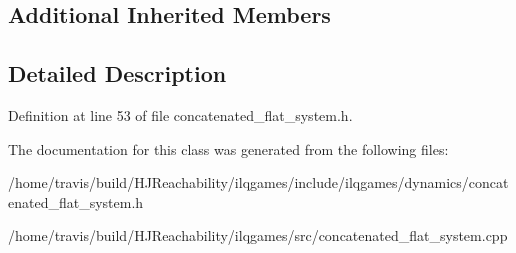 \subsection*{Additional Inherited Members}


\subsection{Detailed Description}


Definition at line 53 of file concatenated\+\_\+flat\+\_\+system.\+h.



The documentation for this class was generated from the following files\+:\begin{DoxyCompactItemize}
\item 
/home/travis/build/\+H\+J\+Reachability/ilqgames/include/ilqgames/dynamics/concatenated\+\_\+flat\+\_\+system.\+h\item 
/home/travis/build/\+H\+J\+Reachability/ilqgames/src/concatenated\+\_\+flat\+\_\+system.\+cpp\end{DoxyCompactItemize}
